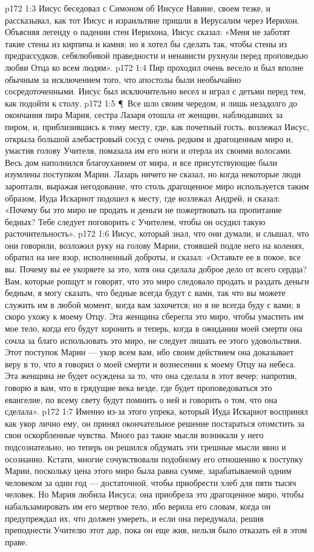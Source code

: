 \vs p172 1:3 Иисус беседовал с Симоном об Иисусе Навине, своем тезке, и рассказывал, как тот Иисус и израильтяне пришли в Иерусалим через Иерихон. Объясняя легенду о падении стен Иерихона, Иисус сказал: «Меня не заботят такие стены из кирпича и камня; но я хотел бы сделать так, чтобы стены из предрассудков, себялюбивой праведности и ненависти рухнули перед проповедью любви Отца ко всем людям».
\vs p172 1:4 Пир проходил очень весело и был вполне обычным за исключением того, что апостолы были необычайно сосредоточенными. Иисус был исключительно весел и играл с детьми перед тем, как подойти к столу.
\vs p172 1:5 \P\ Все шло своим чередом, и лишь незадолго до окончания пира Мария, сестра Лазаря отошла от женщин, наблюдавших за пиром, и, приблизившись к тому месту, где, как почетный гость, возлежал Иисус, открыла большой алебастровый сосуд с очень редким и драгоценным миро и, умастив голову Учителя, помазала им его ноги и отерла их своими волосами. Весь дом наполнился благоуханием от мира, и все присутствующие были изумлены поступком Марии. Лазарь ничего не сказал, но когда некоторые люди зароптали, выражая негодование, что столь драгоценное миро используется таким образом, Иуда Искариот подошел к месту, где возлежал Андрей, и сказал: «Почему бы это миро не продать и деньги не пожертвовать на пропитание бедных? Тебе следует поговорить с Учителем, чтобы он осудил такую расточительность».
\vs p172 1:6 Иисус, который знал, что они думали, и слышал, что они говорили, возложил руку на голову Марии, стоявшей подле него на коленях, обратил на нее взор, исполненный доброты, и сказал: «Оставьте ее в покое, все вы. Почему вы ее укоряете за это, хотя она сделала доброе дело от всего сердца? Вам, которые ропщут и говорят, что это миро следовало продать и раздать деньги бедным, я могу сказать, что бедные всегда будут с вами, так что вы можете служить им в любой момент, когда вам захочется; но я не всегда буду с вами; я скоро ухожу к моему Отцу. Эта женщина сберегла это миро, чтобы умастить им мое тело, когда его будут хоронить и теперь, когда в ожидании моей смерти она сочла за благо использовать это миро, не следует лишать ее этого удовольствия. Этот поступок Марии --- укор всем вам, ибо своим действием она доказывает веру в то, что я говорил о моей смерти и вознесении к моему Отцу на небеса. Эта женщина не будет осуждена за то, что она сделала в этот вечер; напротив, говорю я вам, что в грядущие века везде, где будет проповедоваться это евангелие, по всему свету будут помнить о ней и говорить о том, что она сделала».
\vs p172 1:7 Именно из\hyp{}за этого упрека, который Иуда Искариот воспринял как укор лично ему, он принял окончательное решение постараться отомстить за свои оскорбленные чувства. Много раз такие мысли возникали у него подсознательно, но теперь он решился обдумать эти грешные мысли явно и осознанно. Кстати, многие сочувствовали подобному его отношению к поступку Марии, поскольку цена этого миро была равна сумме, зарабатываемой одним человеком за один год --- достаточной, чтобы приобрести хлеб для пяти тысяч человек. Но Мария любила Иисуса; она приобрела это драгоценное миро, чтобы набальзамировать им его мертвое тело, ибо верила его словам, когда он предупреждал их, что должен умереть, и если она передумала, решив преподнести Учителю этот дар, пока он еще жив, нельзя было отказать ей в этом праве.
